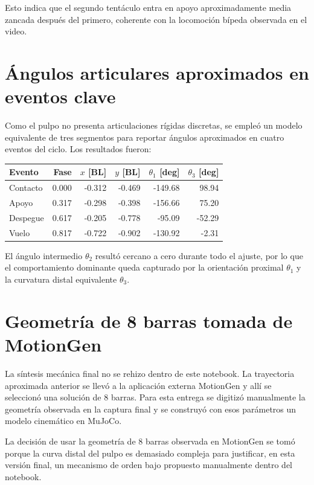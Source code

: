 \documentclass[11pt]{article}
\begin{document}
Esto indica que el segundo tentáculo entra en apoyo aproximadamente media zancada después del primero, coherente con la locomoción bípeda observada en el video.

\section*{Ángulos articulares aproximados en eventos clave}
Como el pulpo no presenta articulaciones rígidas discretas, se empleó un modelo equivalente de tres segmentos para reportar ángulos aproximados en cuatro eventos del ciclo. Los resultados fueron:

\begin{center}
\small
\begin{tabular}{lrrrrr}
\toprule
Evento & Fase & \(x\) [BL] & \(y\) [BL] & \(\theta_1\) [deg] & \(\theta_3\) [deg] \\
\midrule
Contacto & 0.000 & -0.312 & -0.469 & -149.68 & 98.94 \\
Apoyo & 0.317 & -0.298 & -0.398 & -156.66 & 75.20 \\
Despegue & 0.617 & -0.205 & -0.778 & -95.09 & -52.29 \\
Vuelo & 0.817 & -0.722 & -0.902 & -130.92 & -2.31 \\
\bottomrule
\end{tabular}
\end{center}

El ángulo intermedio \(\theta_2\) resultó cercano a cero durante todo el ajuste, por lo que el comportamiento dominante queda capturado por la orientación proximal \(\theta_1\) y la curvatura distal equivalente \(\theta_3\).

\section*{Geometría de 8 barras tomada de MotionGen}
La síntesis mecánica final no se rehizo dentro de este notebook. La trayectoria aproximada anterior se llevó a la aplicación externa MotionGen y allí se seleccionó una solución de 8 barras. Para esta entrega se digitizó manualmente la geometría observada en la captura final y se construyó con esos parámetros un modelo cinemático en MuJoCo.

La decisión de usar la geometría de 8 barras observada en MotionGen se tomó porque la curva distal del pulpo es demasiado compleja para justificar, en esta versión final, un mecanismo de orden bajo propuesto manualmente dentro del notebook.
\end{document}
